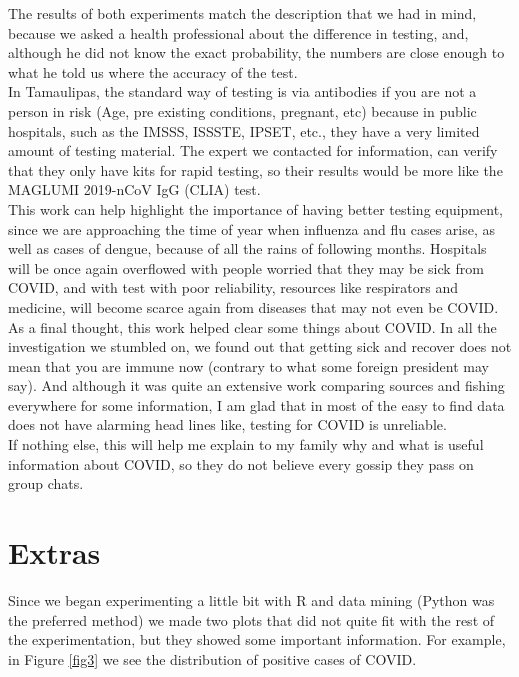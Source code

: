 \documentclass{article}
\begin{document}
The results of both experiments match the description that we had in mind, because we asked a health professional about the difference in testing, and, although he did not know the exact probability, the numbers are close enough to what he told us where the accuracy of the test. \\

In Tamaulipas, the standard way of testing is via antibodies if you are not a person in risk (Age, pre existing conditions, pregnant, etc) because in public hospitals, such as the IMSSS, ISSSTE, IPSET, etc., they have a very limited amount of testing material. The expert we contacted for information, can verify that they only have kits for rapid testing, so their results would be more like the MAGLUMI 2019-nCoV IgG (CLIA) test.\\

This work can help highlight the importance of having better testing equipment, since we are approaching the time of year when influenza and flu cases arise, as well as cases of dengue, because of all the rains of following months. Hospitals will be once again overflowed with people worried that they may be sick from COVID, and with test with poor reliability, resources like respirators and medicine, will become scarce again from diseases that may not even be COVID.\\

As a final thought, this work helped clear some things about COVID. In all the investigation we stumbled on, we found out that getting sick and recover does not mean that you are immune now (contrary to what some foreign president may say). And although it was quite an extensive work comparing sources and fishing everywhere for some information, I am glad that in most of the easy to find data does not have alarming head lines like, testing for COVID is unreliable. \\

If nothing else, this will help me explain to my family why and what is useful information about COVID, so they do not believe every gossip they pass on group chats.\\

\section{Extras}

Since we began experimenting a little bit with R and data mining (Python was the preferred method) we made two plots that did not quite fit with the rest of the experimentation, but they showed some important information. For example, in Figure \ref{fig3} we see the distribution of positive cases of COVID.\\
\end{document}
